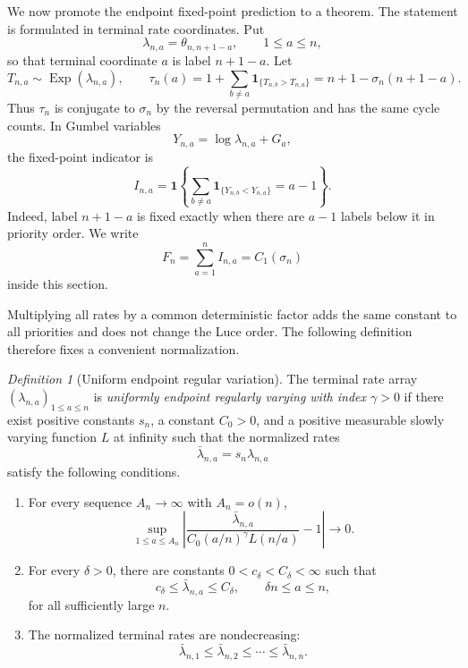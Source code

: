 \documentclass[11pt]{article}
\theoremstyle{remark}
\newtheorem{definition}[theorem]{Definition}
\newcommand{\one}{\mathbf 1}
\newcommand{\Exp}{\operatorname{Exp}}
\begin{document}
We now promote the endpoint fixed-point prediction to a theorem.  The statement
is formulated in terminal rate coordinates.  Put
\[
        \lambda_{n,a}=\theta_{n,n+1-a},
        \qquad 1\le a\le n,
\]
so that terminal coordinate \(a\) is label \(n+1-a\).  Let
\[
        T_{n,a}\sim\Exp(\lambda_{n,a}),
        \qquad
        \tau_n(a)=1+\sum_{b\ne a}\one_{\{T_{n,b}>T_{n,a}\}}
        =n+1-\sigma_n(n+1-a).
\]
Thus $\tau_n$ is conjugate to $\sigma_n$ by the reversal permutation and has
the same cycle counts.  In Gumbel variables
\[
        Y_{n,a}=\log \lambda_{n,a}+G_a,
\]
the fixed-point indicator is
\[
        I_{n,a}=\one\left\{
        \sum_{b\ne a}\one_{\{Y_{n,b}<Y_{n,a}\}}=a-1
        \right\}.
\]
Indeed, label \(n+1-a\) is fixed exactly when there are \(a-1\) labels below
it in priority order.  We write
\[
        F_n=\sum_{a=1}^n I_{n,a}=C_1(\sigma_n)
\]
inside this section.

Multiplying all rates by a common deterministic factor adds the same constant to
all priorities and does not change the Luce order.  The following definition
therefore fixes a convenient normalization.

\begin{definition}[Uniform endpoint regular variation]\label{def:endpoint-rv}
The terminal rate array \((\lambda_{n,a})_{1\le a\le n}\) is
\emph{uniformly endpoint regularly varying with index \(\gamma>0\)} if there
exist positive constants \(s_n\), a constant \(C_0>0\), and a positive
measurable slowly varying function \(L\) at infinity such that the normalized
rates
\[
        \bar\lambda_{n,a}=s_n\lambda_{n,a}
\]
satisfy the following conditions.

\begin{enumerate}[label=(ER\arabic*)]
\item For every sequence \(A_n\to\infty\) with \(A_n=o(n)\),
\[
        \sup_{1\le a\le A_n}
        \left|
        \frac{\bar\lambda_{n,a}}
        {C_0(a/n)^\gamma L(n/a)}-1
        \right|\longrightarrow0.
\]
\item For every \(\delta>0\), there are constants
\(0<c_\delta<C_\delta<\infty\) such that
\[
        c_\delta\le \bar\lambda_{n,a}\le C_\delta,
        \qquad \delta n\le a\le n,
\]
for all sufficiently large \(n\).
\item The normalized terminal rates are nondecreasing:
\[
        \bar\lambda_{n,1}\le\bar\lambda_{n,2}
        \le\cdots\le\bar\lambda_{n,n}.
\]
\end{enumerate}
\end{definition}
\end{document}
